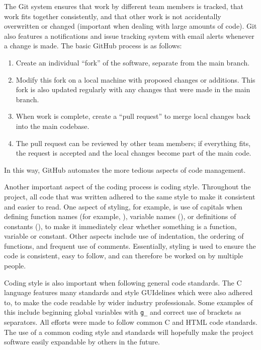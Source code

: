 The Git system ensures that work by different team members is tracked\cite{github_contribs}, that work fits together consistently, and that other work is not accidentally overwritten or changed (important when dealing with large amounts of code). Git also features a notifications and issue tracking system with email alerts whenever a change is made. The basic GitHub process is as follows:

\begin{enumerate}
	\item Create an individual ``fork'' of the software, separate from the main branch.
	\item Modify this fork on a local machine with proposed changes or additions. This fork is also updated regularly with any changes that were made in the main branch.
	\item When work is complete, create a ``pull request'' to merge local changes back into the main codebase.
	\item The pull request can be reviewed by other team members; if everything fits, the request is accepted and the local changes become part of the main code. 
\end{enumerate}
In this way, GitHub automates the more tedious aspects of code management.

Another important aspect of the coding process is coding style. Throughout the project, all code that was written adhered to the same style to make it consistent and easier to read. One aspect of styling, for example, is use of capitals when defining function names (for example, ), variable names (), or definitions of constants (), to make it immediately clear whether something is a function, variable or constant. Other aspects include use of indentation, the ordering of functions, and frequent use of comments. Essentially, styling is used to ensure the code is consistent, easy to follow, and can therefore be worked on by multiple people. 

Coding style is also important when following general code standards. The C language features many standards and style GUIdelines which were also adhered to, to make the code readable by wider industry professionals. Some examples of this include beginning global variables with \texttt{g_} and correct use of brackets as separators\cite{mellon}. All efforts were made to follow common C and HTML code standards. The use of a common coding style and standards will hopefully make the project software easily expandable by others in the future.


